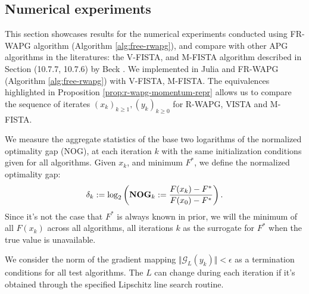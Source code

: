 \documentclass[12pt]{article}
\begin{document}
    \subsection{Numerical experiments}
        This section showcases results for the numerical experiments conducted using FR-WAPG algorithm (Algorithm \ref{alg:free-rwapg}), and compare with other APG algorithms in the literatures: the V-FISTA, and M-FISTA algorithm described in Section (10.7.7, 10.7.6) by Beck \cite{beck_first-order_2017}. 
        We implemented in Julia \cite{bezanson_julia_2017} and FR-WAPG (Algorithm \ref{alg:free-rwapg}) with V-FISTA, M-FISTA. 
        The equivalences highlighted in Proposition \ref{prop:r-wapg-momentum-repr} allows us to compare the sequence of iterates $(x_k)_{k \ge 1}, (y_k)_{k \ge0}$ for R-WAPG, VISTA and M-FISTA. 
        \par
        We measure the aggregate statistics of the base two logarithms of the normalized optimality gap (NOG), at each iteration $k$ with the same initialization conditions given for all algorithms.
        Given $x_k$, and minimum $F^*$, we define the normalized optimality gap: 
        \newcommand{\NOG}{\text{\textbf{NOG}}}
        \begin{align*}
            \delta_k := \log_2\left(
                \NOG_k := \frac{F(x_k) - F^*}{F(x_0) - F^*}
            \right). 
        \end{align*}
        Since it's not the case that $F^*$ is always known in prior, we will the minimum of all $F(x_k)$ across all algorithms, all iterations $k$ as the surrogate for $F^*$ when the true value is unavailable. 
        \par 
        We consider the norm of the gradient mapping $\Vert \mathcal G_L(y_k)\Vert < \epsilon$ as a termination conditions for all test algorithms. 
        The $L$ can change during each iteration if it's obtained through the specified Lipschitz line search routine. 
\end{document}
